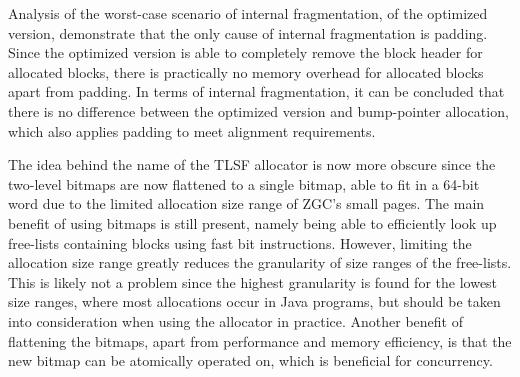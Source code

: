 Analysis of the worst-case scenario of internal fragmentation, of the optimized version, demonstrate that the only cause of internal fragmentation is padding. Since the optimized version is able to completely remove the block header for allocated blocks, there is practically no memory overhead for allocated blocks apart from padding. In terms of internal fragmentation, it can be concluded that there is no difference between the optimized version and bump-pointer allocation, which also applies padding to meet alignment requirements.

The idea behind the name of the TLSF allocator is now more obscure since the two-level bitmaps are now flattened to a single bitmap, able to fit in a 64-bit word due to the limited allocation size range of ZGC's small pages. The main benefit of using bitmaps is still present, namely being able to efficiently look up free-lists containing blocks using fast bit instructions. However, limiting the allocation size range greatly reduces the granularity of size ranges of the free-lists. This is likely not a problem since the highest granularity is found for the lowest size ranges, where most allocations occur in Java programs, but should be taken into consideration when using the allocator in practice. Another benefit of flattening the bitmaps, apart from performance and memory efficiency, is that the new bitmap can be atomically operated on, which is beneficial for concurrency.

